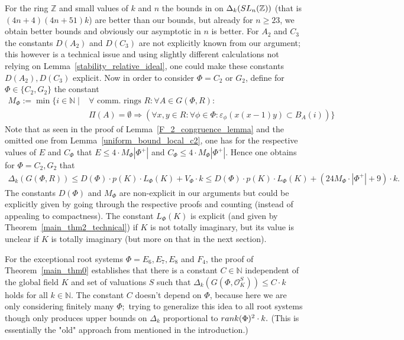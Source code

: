 \documentclass[12pt]{amsart}
\newcommand{\C}[1]{{\mathcal #1}}
\theoremstyle{definition}\newtheorem{definition}[theorem]{Definition}
\theoremstyle{remark}\newtheorem{remark}[theorem]{Remark}
\theoremstyle{definition}\newtheorem{case}{Case}
\begin{document}
For the ring $\mathbb{Z}$ and small values of $k$ and $n$ the bounds in \cite{KLM} on $\Delta_k({\rm SL}_n(\mathbb{Z}))$ (that is $(4n+4)(4n+51)k$) are better than our bounds, but already for $n\geq 23$, we obtain better bounds and obviously our asymptotic in $n$ is better. For $A_2$ and $C_3$ the constants $D(A_2)$ and $D(C_3)$ are not explicitly known from our argument; this however is a technical issue and using slightly different calculations not relying on Lemma~\ref{stability_relative_ideal}, one could make these constants $D(A_2),D(C_3)$ explicit. Now in order to consider $\Phi=C_2$ or $G_2$, define for $\Phi\in\{C_2, G_2\}$ the constant
\begin{align*}
M_{\Phi}:=\min\{i\in\mathbb{N}\mid &\forall\text{ comm. rings }R:\forall A\in G(\Phi,R):\\
&\Pi(A)=\emptyset\Rightarrow (\forall x,y\in R:\forall\phi\in\Phi:\varepsilon_{\phi}(x(x-1)y)\subset B_A(i)) \}
\end{align*}
Note that as seen in the proof of Lemma~\ref{F_2_congruence_lemma} and the omitted one from Lemma~\ref{uniform_bound_local_c2}, one has for the respective values of $E$ and $C_{\Phi}$ that $E\leq 4\cdot M_{\Phi}|\Phi^+|$ and $C_{\Phi}\leq 4\cdot M_{\Phi}|\Phi^+|.$ Hence one obtains for $\Phi=C_2,G_2$ that
\begin{align*}
\Delta_k(G(\Phi,R))\leq D(\Phi)\cdot p(K)\cdot L_{\Phi}(K)+V_{\Phi}\cdot k
\leq D(\Phi)\cdot p(K)\cdot L_{\Phi}(K)+(24M_{\Phi}\cdot|\Phi^+|+9)\cdot k.
\end{align*}
The constants $D(\Phi)$ and $M_{\Phi}$ are non-explicit in our arguments but could be explicitly given by going through the respective proofs and counting (instead of appealing to compactness). The constant $L_{\Phi}(K)$ is explicit (and given by Theorem~\ref{main_thm2_technical}) if $K$ is not totally imaginary, but its value is unclear if $K$ is totally imaginary (but more on that in the next section).

For the exceptional root systems $\Phi=E_6,E_7,E_8$ and $F_4$, the proof of Theorem~\ref{main_thm0} establishes that there is a constant $C\in\mathbb{N}$ independent of the global field $K$ and set of valuations $S$ such that $\Delta_k(G(\Phi,\C O_K^S))\leq C\cdot k$ holds for all $k\in\mathbb{N}.$ The constant $C$ doesn't depend on $\Phi$, because here we are only considering finitely many $\Phi;$ trying to generalize this idea to all root systems though only produces upper bounds on $\Delta_k$ proportional to ${\rm rank}(\Phi)^2\cdot k.$ (This is essentially the "old" approach from \cite{KLM,Chevalley_positive_char_tentative,explicit_strong_bound_sp_2n,General_strong_bound} mentioned in the introduction.)
\end{document}
